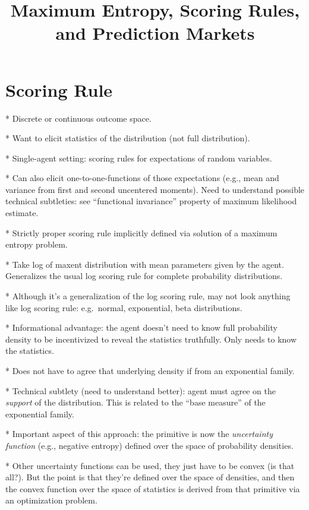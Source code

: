 \documentclass[11pt,letterpaper]{article}
\title{Maximum Entropy, Scoring Rules, and Prediction Markets}
\begin{document}
\maketitle


\section{Scoring Rule}

* Discrete or continuous outcome space.

* Want to elicit statistics of the distribution (not full distribution).

* Single-agent setting: scoring rules for expectations of random variables.

* Can also elicit one-to-one-functions of those expectations (e.g., mean and variance from first and second uncentered moments). Need to understand possible technical subtleties: see ``functional invariance'' property of maximum likelihood estimate. 

* Strictly proper scoring rule implicitly defined via solution of a maximum entropy problem.

* Take log of maxent distribution with mean parameters given by the agent. Generalizes the usual log scoring rule for complete probability distributions.

* Although it's a generalization of the log scoring rule, may not look anything like log scoring rule: e.g.\ normal, exponential, beta distributions.

* Informational advantage: the agent doesn't need to know full probability density to be incentivized to reveal the statistics truthfully. Only needs to know the statistics.

* Does not have to agree that underlying density if from an exponential family.

* Technical subtlety (need to understand better): agent must agree on the \emph{support} of the distribution. This is related to the ``base measure'' of the exponential family.

* Important aspect of this approach: the primitive is now the \emph{uncertainty function} (e.g., negative entropy) defined over the space of probability densities.

* Other uncertainty functions can be used, they just have to be convex (is that all?). But the point is that they're defined over the space of densities, and then the convex function over the space of statistics is derived from that primitive via an optimization problem.
\end{document}
